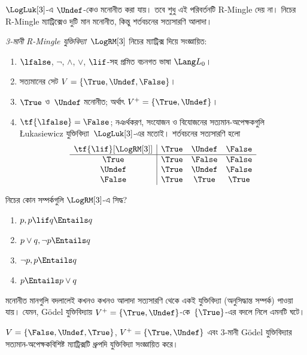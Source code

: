\documentclass[../../../include/open-logic-section]{subfiles}
\begin{document}
$\LogLuk[3]$-এ $\Undef$-কেও মনোনীত করা যায়। তবে শুধু এই পরিবর্তনটি
R-Mingle দেয় না। নিচের R-Mingle ম্যাট্রিক্সেও দুটি মান মনোনীত, কিন্তু
শর্তবচনের সত্যসারণি আলাদা।

\begin{defn}
  \emph{3-মানী R-Mingle যুক্তিবিদ্যা}~$\LogRM[3]$ নিচের ম্যাট্রিক্স
  দিয়ে সংজ্ঞায়িত:
  \begin{enumerate}
    \item $\lfalse$, $\lnot$, $\land$, $\lor$, $\lif$-সহ প্রমিত বচনগত
    ভাষা $\Lang L_0$।
    \item সত্যমানের সেট $V = \{\True, \Undef, \False\}$।
    \item $\True$ ও~$\Undef$ মনোনীত; অর্থাৎ
    $V^+ = \{\True, \Undef\}$।
    \item $\tf{\lfalse}=\False$; নঞর্থকরণ, সংযোজন ও বিযোজনের
    সত্যমান-অপেক্ষকগুলি \L ukasiewicz যুক্তিবিদ্যা~$\LogLuk[3]$-এর মতোই।
    শর্তবচনের সত্যসারণি হলো
    \[
    \begin{array}{c|ccc}
      \tf{\lif}[\LogRM[3]] & \True & \Undef & \False \\
      \hline
      \True & \True & \False & \False \\
      \Undef & \True & \Undef & \False \\
      \False & \True & \True & \True
    \end{array}
    \]
  \end{enumerate}
\end{defn}

\begin{prob}
  নিচের কোন সম্পর্কগুলি $\LogRM[3]$-এ সিদ্ধ?
  \begin{enumerate}
    \item $p, p \lif q \Entails q$
    \item $p \lor q, \lnot p \Entails q$
    \item $\lnot p, p \Entails q$
    \item $p \Entails p \lor q$
  \end{enumerate}
\end{prob}

মনোনীত মানগুলি বদলালেই কখনও কখনও আলাদা সত্যসারণি থেকে একই যুক্তিবিদ্যা
(অনুসিদ্ধান্ত সম্পর্ক) পাওয়া যায়। যেমন, G\"odel যুক্তিবিদ্যায়
$V^+ = \{\True, \Undef\}$-কে~$\{\True\}$-এর বদলে নিলে এমনটি ঘটে।

\begin{prop}
  $V = \{\False, \Undef,\True\}$, $V^+=\{\True, \Undef\}$ এবং
  $3$-মানী G\"odel যুক্তিবিদ্যার সত্যমান-অপেক্ষকবিশিষ্ট ম্যাট্রিক্সটি
  ধ্রুপদি যুক্তিবিদ্যা সংজ্ঞায়িত করে।
\end{prop}
\end{document}

